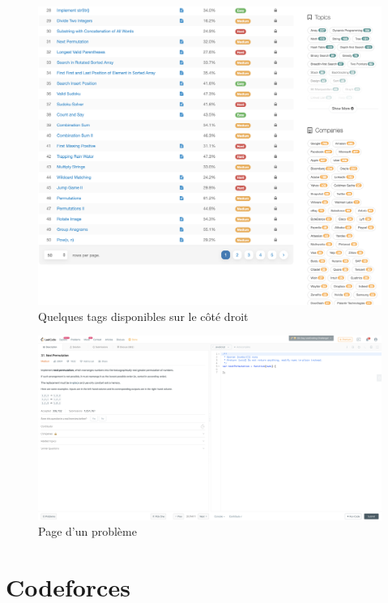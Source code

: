 \begin{figure}[H]
    \includegraphics[width=\textwidth,height=0.6\textheight,keepaspectratio]{images/comparison/leetcode-2.png}
    \centering
    \caption[Leetcode : quelques \glspl{tag} disponibles sur le côté droit]{Quelques \glspl{tag} disponibles sur le côté droit}
\end{figure}

\begin{figure}[H]
    \includegraphics[width=\textwidth,height=0.35\textheight,keepaspectratio]{images/comparison/leetcode-3.png}
    \centering
    \caption[Leetcode : page d'un problème]{Page d'un problème}
\end{figure}


\section{Codeforces}


